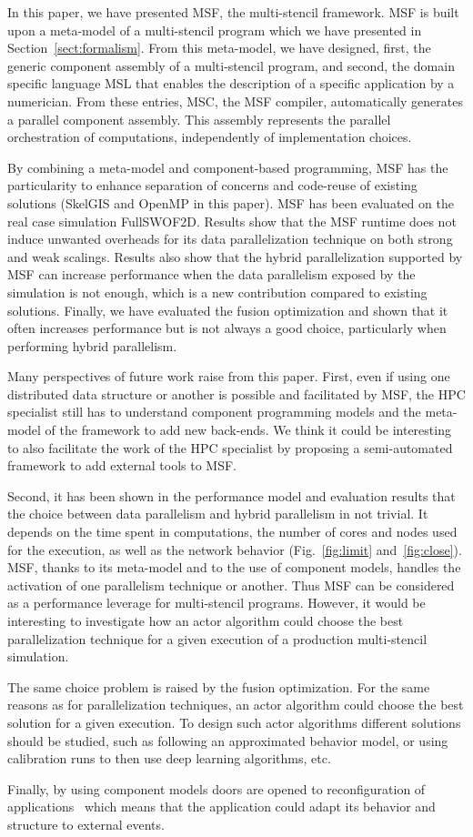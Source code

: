 In this paper, we have presented MSF, the multi-stencil framework.
MSF is built upon a meta-model of a multi-stencil program which we have presented in Section~\ref{sect:formalism}.
From this meta-model, we have designed, first, the generic component assembly of a multi-stencil program, and second, the domain specific language MSL that enables the description of a specific application by a numerician.
From these entries, MSC, the MSF compiler, automatically generates a parallel component assembly.
This assembly represents the parallel orchestration of computations, independently of implementation choices.

By combining a meta-model and component-based programming, MSF has the particularity to enhance separation of concerns and code-reuse of existing solutions (\eg SkelGIS and OpenMP in this paper).
MSF has been evaluated on the real case simulation FullSWOF2D.
Results show that the MSF runtime does not induce unwanted overheads for its data parallelization technique on both strong and weak scalings.
Results also show that the hybrid parallelization supported by MSF can increase performance when the data parallelism exposed by the simulation is not enough, which is a new contribution compared to existing solutions.
Finally, we have evaluated the fusion optimization and shown that it often increases performance but is not always a good choice, particularly when performing hybrid parallelism.

Many perspectives of future work raise from this paper. First, even if using one distributed data structure or another is possible and facilitated by MSF, the HPC specialist still has to understand component programming models and the meta-model of the framework to add new back-ends. We think it could be interesting to also facilitate the work of the HPC specialist by proposing a semi-automated framework to add external tools to MSF.

Second, it has been shown in the performance model and evaluation results that the choice between data parallelism and hybrid parallelism in not trivial. It depends on the time spent in computations, the number of cores and nodes used for the execution, as well as the network behavior (Fig.~\ref{fig:limit} and~\ref{fig:close}). MSF, thanks to its meta-model and to the use of component models, handles the activation of one parallelism technique or another. Thus MSF can be considered as a performance leverage for multi-stencil programs. However, it would be interesting to investigate how an actor algorithm could choose the best parallelization technique for a given execution of a production multi-stencil simulation.

The same choice problem is raised by the fusion optimization. For the same reasons as for parallelization techniques, an actor algorithm could choose the best solution for a given execution. To design such actor algorithms different solutions should be studied, such as following an approximated behavior model, or using calibration runs to then use deep learning algorithms, etc.

Finally, by using component models doors are opened to reconfiguration of applications~\cite{Lanore:2015:RCM:2737166.2737169} which means that the application could adapt its behavior and structure to external events.
